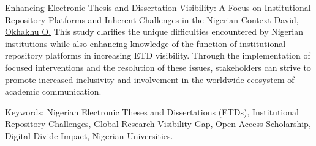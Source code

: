 \begin{abstract_online}{Enhancing Electronic Thesis and Dissertation Visibility: A Focus on Institutional Repository Platforms and Inherent Challenges in the Nigerian Context}{%
        \underline{David, Okhakhu O.}}
    This study clarifies the unique difficulties encountered by Nigerian institutions while also enhancing knowledge of the function of institutional repository platforms in increasing ETD visibility. Through the implementation of focused interventions and the resolution of these issues, stakeholders can strive to promote increased inclusivity and involvement in the worldwide ecosystem of academic communication. 

    Keywords: Nigerian Electronic Theses and Dissertations (ETDs), Institutional Repository Challenges, Global Research Visibility Gap, Open Access Scholarship, Digital Divide Impact, Nigerian Universities.
\end{abstract_online}

